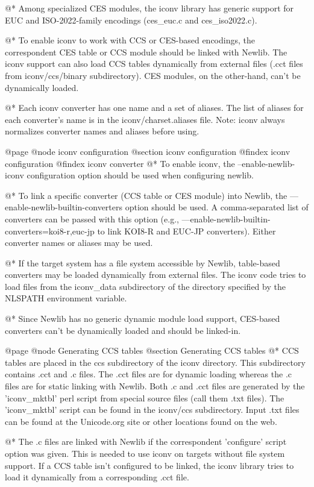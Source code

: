 @*
Among specialized CES modules, the iconv library has
generic support for EUC and ISO-2022-family encodings (ces_euc.c and
ces_iso2022.c).

@*
To enable iconv to work with CCS or CES-based encodings, the correspondent
CES table or CCS module should be linked with Newlib.  The iconv support
can also load CCS tables dynamically from external files (.cct files from
iconv/ccs/binary subdirectory).  CES modules, on the other-hand, can't 
be dynamically loaded.

@*
Each iconv converter has one name and a set of aliases. The list of
aliases for each converter's name is in the iconv/charset.aliases file.
Note: iconv always normalizes converter names and aliases before using.

@page
@node iconv configuration
@section iconv configuration
@findex iconv configuration
@findex iconv converter
@*
To enable iconv, the --enable-newlib-iconv configuration option should be
used when configuring newlib.

@*
To link a specific converter (CCS table or CES module) into Newlib, the
---enable-newlib-builtin-converters option should be used.  A 
comma-separated list of converters can be passed with this option
(e.g., ---enable-newlib-builtin-converters=koi8-r,euc-jp to link KOI8-R
and EUC-JP converters).  Either converter names or aliases may be used.

@*
If the target system has a file system accessible by Newlib, table-based
converters may be loaded dynamically from external files.  The iconv 
code tries to load files from the iconv_data subdirectory of the directory 
specified by the NLSPATH environment variable.

@*
Since Newlib has no generic dynamic module load support, CES-based converters
can't be dynamically loaded and should be linked-in.

@page
@node Generating CCS tables
@section Generating CCS tables
@*
CCS tables are placed in the ccs subdirectory of the iconv directory.  
This subdirectory contains .cct and .c files.  The .cct files are for 
dynamic loading whereas the .c files are for static linking with Newlib. 
Both .c and .cct files are generated by the 'iconv_mktbl' perl script 
from special source files (call them
.txt files).  The 'iconv_mktbl' script can be found in the iconv/ccs
subdirectory.  Input .txt files can be found at the Unicode.org site or
other locations found on the web.

@*
The .c files are linked with Newlib if the correspondent 'configure' script 
option was given.  This is needed to use iconv on targets without file system 
support.  If a CCS table isn't configured to be linked, the iconv library 
tries to load it dynamically from a corresponding .cct file.

